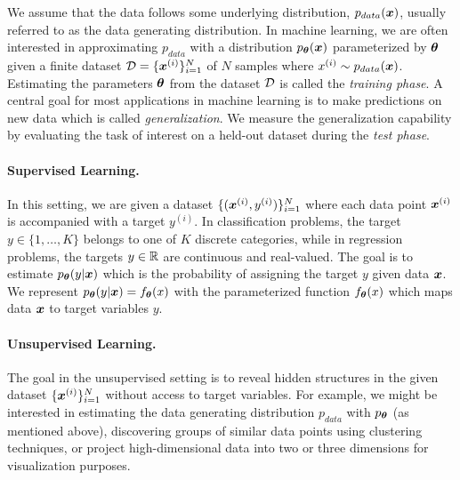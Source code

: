 We assume that the data follows some underlying distribution, $p_{data}({\bm{x}})$, usually referred to as the data generating distribution. In machine learning, we are often interested in approximating $p_{data}$ with a distribution $p_{{\bm{\theta}}}({\bm{x}})$ parameterized by ${\bm{\theta}}$ given a finite dataset ${\mathcal{D}} = \{{\bm{x}}^{(i)}\}_{i=1}^{N}$ of $N$ samples where $x^{(i)} \sim p_{data}({\bm{x}})$. Estimating the parameters ${\bm{\theta}}$ from the dataset ${\mathcal{D}}$ is called the \textit{training phase}. A central goal for most applications in machine learning is to make predictions on new data which is called \textit{generalization}. We measure the generalization capability by evaluating the task of interest on a held-out dataset during the \textit{test phase}.

\vspace{-3mm}
\paragraph{Supervised Learning.} In this setting, we are given a dataset $\{({\bm{x}}^{(i)}, y^{(i)})\}_{i=1}^{N}$ where each data point ${\bm{x}}^{(i)}$ is accompanied with a target $y^{(i)}$. In classification problems, the target $y \in \{1, \dots, K\}$ belongs to one of $K$ discrete categories, while in regression problems, the targets $y \in \mathbb{R}$ are continuous and real-valued. The goal is to estimate $p_{{\bm{\theta}}}(y | {\bm{x}})$ which is the probability of assigning the target $y$ given data ${\bm{x}}$. We represent $p_{{\bm{\theta}}}(y | {\bm{x}}) = f_{{\bm{\theta}}}(x)$ with the parameterized function $f_{{\bm{\theta}}}(x)$ which maps data ${\bm{x}}$ to target variables $y$.  


\vspace{-3mm}
\paragraph{Unsupervised Learning.} The goal in the unsupervised setting is to reveal hidden structures in the given dataset $\{{\bm{x}}^{(i)}\}_{i=1}^{N}$ without access to target variables. For example, we might be interested in estimating the data generating distribution $p_{data}$ with $p_{{\bm{\theta}}}$ (as mentioned above), discovering groups of similar data points using clustering techniques, or project high-dimensional data into two or three dimensions for visualization purposes. 

